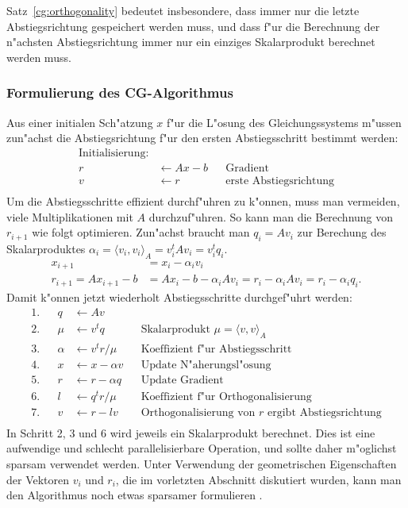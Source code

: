 Satz~\ref{cg:orthogonality}
bedeutet insbesondere, dass immer nur die letzte Abstiegsrichtung
gespeichert werden muss, und dass f"ur die Berechnung der n"achsten
Abstiegsrichtung immer nur ein einziges Skalarprodukt berechnet werden
muss.

\subsubsection{Formulierung des CG-Algorithmus}
Aus einer initialen Sch"atzung $x$ f"ur die L"osung des Gleichungssystems
m"ussen zun"achst die Abstiegsrichtung f"ur den ersten Abstiegsschritt
bestimmt werden:
\begin{align*}
\text{Initialisierung:}&&&\\
r&\leftarrow Ax - b&&\text{Gradient}\\
v&\leftarrow r     &&\text{erste Abstiegsrichtung}\\
\end{align*}
Um die Abstiegsschritte effizient durchf"uhren zu k"onnen, muss man
vermeiden, viele Multiplikationen mit $A$ durchzuf"uhren.
So kann man die Berechnung von $r_{i+1}$ wie folgt optimieren. 
Zun"achst braucht man $q_i=Av_i$ zur Berechung des Skalarproduktes
$\alpha_i = \langle v_i,v_i\rangle_A=v_i^tAv_i=v_i^tq_i$. 
\begin{align*}
           x_{i+1}&=x_i-\alpha_i v_i\\
r_{i+1}=Ax_{i+1}-b&=Ax_i-b-\alpha_i Av_i=r_i-\alpha_i Av_i = r_i-\alpha_i q_i.
\end{align*}
Damit k"onnen jetzt wiederholt Abstiegsschritte durchgef"uhrt werden:
\begin{align*}
1.&&     q&\leftarrow Av            &&\\
2.&&   \mu&\leftarrow v^t q         &&\text{Skalarprodukt
                                            $\mu=\langle v,v\rangle_A$}\\
3.&&\alpha&\leftarrow v^t r/\mu     &&\text{Koeffizient f"ur Abstiegsschritt}\\
4.&&     x&\leftarrow x-\alpha v    &&\text{Update N"aherungsl"osung}\\
5.&&     r&\leftarrow r-\alpha q    &&\text{Update Gradient}\\
6.&&     l&\leftarrow q^tr/\mu      &&\text{Koeffizient f"ur
                                            Orthogonalisierung}\\
7.&&     v&\leftarrow r - l v       &&\text{Orthogonalisierung von $r$ ergibt
                                            Abstiegsrichtung}\\
\end{align*}
In Schritt 2, 3 und 6 wird jeweils ein Skalarprodukt berechnet.
Dies ist eine aufwendige und schlecht parallelisierbare Operation,
und sollte daher m"oglichst sparsam verwendet werden.
Unter Verwendung der geometrischen Eigenschaften der Vektoren $v_i$ und
$r_i$, die im vorletzten Abschnitt diskutiert wurden, kann man den
Algorithmus noch etwas sparsamer formulieren \cite[Chapter 8.7]{skript:watkins}.


